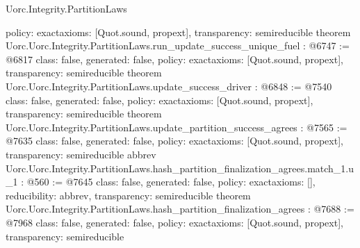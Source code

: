 \begin{lexlean}{Uorc.Integrity.PartitionLaws}
\begin{coremodule}
{  policy: exact{axioms: [Quot.sound, propext]},
  transparency: semireducible
}
theorem Uorc.Uorc.Integrity.PartitionLaws.run_update_success_unique_fuel : @6747 := @6817 {
  class: false,
  generated: false,
  policy: exact{axioms: [Quot.sound, propext]},
  transparency: semireducible
}
theorem Uorc.Uorc.Integrity.PartitionLaws.update_success_driver : @6848 := @7540 {
  class: false,
  generated: false,
  policy: exact{axioms: [Quot.sound, propext]},
  transparency: semireducible
}
theorem Uorc.Uorc.Integrity.PartitionLaws.update_partition_success_agrees : @7565 := @7635 {
  class: false,
  generated: false,
  policy: exact{axioms: [Quot.sound, propext]},
  transparency: semireducible
}
abbrev Uorc.Uorc.Integrity.PartitionLaws.hash_partition_finalization_agrees.match_1.{u_1} : @560 := @7645 {
  class: false,
  generated: false,
  policy: exact{axioms: []},
  reducibility: abbrev{},
  transparency: semireducible
}
theorem Uorc.Uorc.Integrity.PartitionLaws.hash_partition_finalization_agrees : @7688 := @7968 {
  class: false,
  generated: false,
  policy: exact{axioms: [Quot.sound, propext]},
  transparency: semireducible
}


\end{coremodule}
\end{lexlean}
